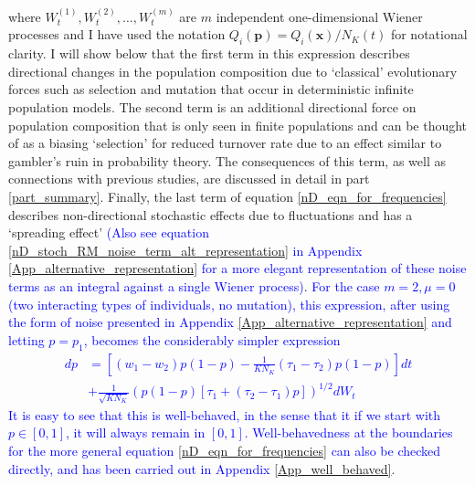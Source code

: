 where $W^{(1)}_t,W^{(2)}_t, \ldots, W^{(m)}_t$ are $m$ independent one-dimensional Wiener processes and I have used the notation $Q_i(\mathbf{p}) = Q_i(\mathbf{x})/N_K(t)$ for notational clarity. I will show below that the first term in this expression describes directional changes in the population composition due to `classical' evolutionary forces such as selection and mutation that occur in deterministic infinite population models. The second term is an additional directional force on population composition that is only seen in finite populations and can be thought of as a biasing `selection' for reduced turnover rate due to an effect similar to gambler's ruin in probability theory. The consequences of this term, as well as connections with previous studies, are discussed in detail in part \ref{part_summary}. Finally, the last term of equation \eqref{nD_eqn_for_frequencies} describes non-directional stochastic effects due to fluctuations and has a `spreading effect' \textcolor{blue}{(Also see equation} \eqref{nD_stoch_RM_noise_term_alt_representation} \textcolor{blue}{in Appendix} \ref{App_alternative_representation} \textcolor{blue}{for a more elegant representation of these noise terms as an integral against a single Wiener process)}. \textcolor{blue}{For the case $m=2, \mu = 0$ (two interacting types of individuals, no mutation), this expression, after using the form of noise presented in Appendix} \ref{App_alternative_representation} \textcolor{blue}{and letting $p = p_1$, becomes the considerably simpler expression
\begin{equation*}
	\begin{aligned}
		dp &= \left[(w_1 - w_2)p(1-p) - \frac{1}{KN_K}(\tau_1-\tau_2)p(1-p)\right]dt\\
		&+ \frac{1}{\sqrt{KN_K}}\left(p(1-p)\left[\tau_1 + (\tau_2 - \tau_1)p\right]\right)^{1/2}dW_t
	\end{aligned}
\end{equation*}
It is easy to see that this is well-behaved, in the sense that it if we start with $p \in [0,1]$, it will always remain in $[0,1]$. Well-behavedness at the boundaries for the more general equation} \eqref{nD_eqn_for_frequencies} \textcolor{blue}{can also be checked directly, and has been carried out in Appendix} \ref{App_well_behaved}.

